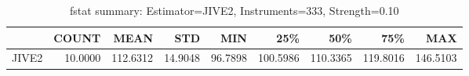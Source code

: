 \begin{table}[ht]
\centering
\caption{fstat summary: Estimator=JIVE2, Instruments=333, Strength=0.10}
\begin{tabular}{lrrrrrrrr}
\toprule
 & COUNT & MEAN & STD & MIN & 25\% & 50\% & 75\% & MAX \\
\midrule
JIVE2 & 10.0000 & 112.6312 & 14.9048 & 96.7898 & 100.5986 & 110.3365 & 119.8016 & 146.5103 \\
\bottomrule
\end{tabular}
\end{table}
